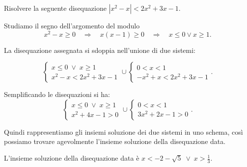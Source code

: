 \begin{exrig}
\begin{esempio}
Risolvere la seguente disequazione $\left|x^2-x\right|<2x^2+3x-1$.

Studiamo il segno dell'argomento del modulo 
\[x^2-x\ge 0 \quad\Rightarrow\quad x(x-1)\ge 0 \quad\Rightarrow\quad x\le 0\vee x\ge 1.\]

La disequazione assegnata si sdoppia nell'unione di due sistemi:

\[\left\{\begin{array}{l}{x\le 0\;\vee\; x\ge 1}\\{x^2-x<2x^2+3x-1}\end{array}\right.\cup \left\{\begin{array}{l}{0<x<1}\\{-x^2+x<2x^2+3x-1}\end{array}\right..\]

 Semplificando le disequazioni si ha:
\begin{equation*}
\left\{\begin{array}{l}{x\le 0\;\vee\; x\ge 1}\\{x^2+4x-1>0}\end{array}\right.\cup \left\{\begin{array}{l}{0<x<1}\\{3x^2+2x-1>0}\end{array}\right..
\end{equation*}

Quindi rappresentiamo gli insiemi soluzione dei due sistemi in uno schema, così possiamo trovare agevolmente l'insieme soluzione della disequazione data.

\begin{center}

\end{center}

L'insieme soluzione della disequazione data è $x<-2-\sqrt 5\;\vee\; x>\frac 1 3$.
\end{esempio}
\end{exrig}

